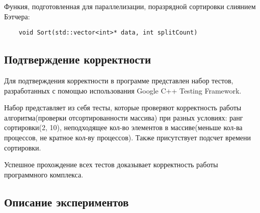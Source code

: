 \documentclass{report}
\begin{document}
Функия, подготовленная для параллелизации, поразрядной сортировки слиянием Бэтчера:
\begin{lstlisting}
	void Sort(std::vector<int>* data, int splitCount)
\end{lstlisting}
\newpage

\begin{center}
\section*{Подтверждение корректности}
\end{center}

Для подтверждения корректности в программе представлен набор тестов, разработанных с помощью использования Google C++ Testing Framework.
\par Набор представляет из себя тесты, которые проверяют корректность работы алгоритма(проверки отсортированности массива) при разных условиях: ранг сортировки(2, 10), неподходящее кол-во элементов в массиве(меньше кол-ва процессов, не кратное кол-ву процессов). Также присутствует подсчет времени сортировки.
\par Успешное прохождение всех тестов доказывает корректность работы программного комплекса.
\newpage

\begin{center}
\section*{Описание экспериментов}
\end{center}
\end{document}
